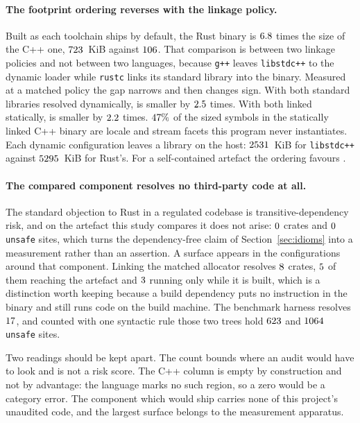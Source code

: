 \documentclass[english,oneside,a4paper,censored,csm,software-track-2020]{HYthesisML}
\begin{document}
\paragraph{The footprint ordering reverses with the linkage policy.}
Built as each toolchain ships by default, the Rust \texttt{\FootTarget} binary is
$6.8$ times the size of the C++ one, $723$~KiB against
$106$. That comparison is between two linkage policies and not between two languages,
because \texttt{g++} leaves \texttt{libstdc++} to the dynamic loader while \texttt{rustc} links its
standard library into the binary. Measured at a matched policy the gap narrows and then changes
sign. With both standard libraries resolved dynamically, \FootDynamicSmaller{} is smaller by
$2.5$ times. With both linked statically, \FootStaticSmaller{} is smaller by
$2.2$ times. $47\%$ of the sized symbols in the statically linked
C++ binary are locale and stream facets this program never instantiates. Each dynamic configuration
leaves a library on the host: $2531$~KiB for \texttt{libstdc++} against
$5295$~KiB for Rust's. For a self-contained artefact the ordering favours
\FootStaticSmaller{}.

\paragraph{The compared component resolves no third-party code at all.}
The standard objection to Rust in a regulated codebase is transitive-dependency risk, and on the
artefact this study compares it does not arise: $0$ crates and $0$
\texttt{unsafe} sites, which turns the dependency-free claim of Section~\ref{sec:idioms} into a
measurement rather than an assertion. A surface appears in the configurations around that
component. Linking the matched allocator resolves $8$ crates, $5$ of
them reaching the artefact and $3$ running only while it is built, which is a
distinction worth keeping because a build dependency puts no instruction in the binary and still runs
code on the build machine. The benchmark harness resolves $17$, and counted with one
syntactic rule those two trees hold $623$ and $1064$ \texttt{unsafe}
sites.

Two readings should be kept apart. The count bounds where an audit would have to look and is not a
risk score. The C++ column is empty by construction and not by advantage: the language marks no
such region, so a zero would be a category error. The component which would ship carries none of
this project's unaudited code, and the largest surface belongs to the measurement apparatus.
\end{document}
